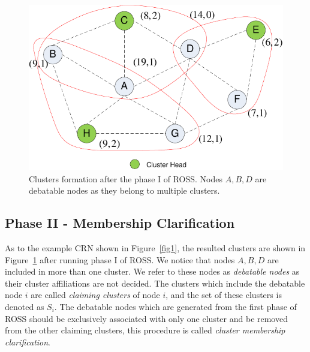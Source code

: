 \documentclass[times]{ettauth}
\theoremstyle{mytheoremstyle}
\theoremstyle{mytheoremstyle}
\theoremstyle{mytheoremstyle}
\begin{document}
\begin{figure}[ht!]
  \centering
  \includegraphics[width=0.5\linewidth]{figure2.pdf}
  \caption{Clusters formation after the phase I of ROSS. Nodes $A, B, D$ are debatable nodes as they belong to multiple clusters.}
  \label{fig2}
\end{figure}


\subsection{Phase II - Membership Clarification}
\label{membershipClarification}
As to the example CRN shown in Figure~\ref{fig1}, the resulted clusters are shown in Figure~\ref{fig2} after running phase I of ROSS.
We notice that nodes $A, B, D$ are included in more than one cluster. 
We refer to these nodes as \textit{debatable nodes} as their cluster affiliations are not decided.
The clusters which include the debatable node $i$ are called \textit{claiming clusters} of node $i$, and the set of these clusters is denoted as $S_i$.  
The debatable nodes which are generated from the first phase of ROSS should be exclusively associated with only one cluster and be removed from the other claiming clusters, this procedure is called \textit{cluster membership clarification}.


%
\end{document}
